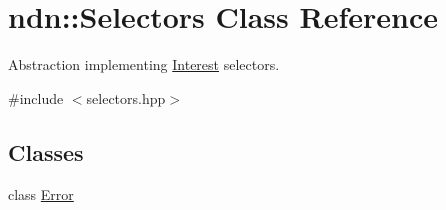 \hypertarget{classndn_1_1Selectors}{}\section{ndn\+:\+:Selectors Class Reference}
\label{classndn_1_1Selectors}


Abstraction implementing \hyperlink{classndn_1_1Interest}{Interest} selectors.  




{\ttfamily \#include $<$selectors.\+hpp$>$}

\subsection*{Classes}
\begin{DoxyCompactItemize}
\item 
class \hyperlink{classndn_1_1Selectors_1_1Error}{Error}
\end{DoxyCompactItemize}
